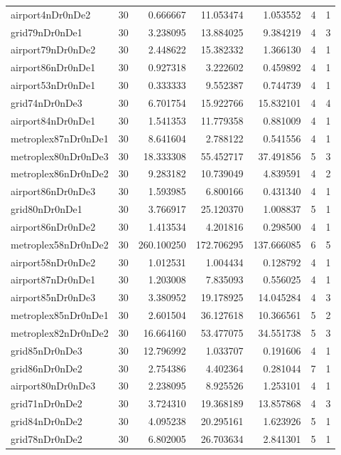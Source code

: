 \begin{longtable}{|l|r|r|r|r|r|r|}
airport4nDr0nDe2 & 30 & 0.666667 & 11.053474 & 1.053552 & 4 & 1 \\
grid79nDr0nDe1 & 30 & 3.238095 & 13.884025 & 9.384219 & 4 & 3 \\
airport79nDr0nDe2 & 30 & 2.448622 & 15.382332 & 1.366130 & 4 & 1 \\
airport86nDr0nDe1 & 30 & 0.927318 & 3.222602 & 0.459892 & 4 & 1 \\
airport53nDr0nDe1 & 30 & 0.333333 & 9.552387 & 0.744739 & 4 & 1 \\
grid74nDr0nDe3 & 30 & 6.701754 & 15.922766 & 15.832101 & 4 & 4 \\
airport84nDr0nDe1 & 30 & 1.541353 & 11.779358 & 0.881009 & 4 & 1 \\
metroplex87nDr0nDe1 & 30 & 8.641604 & 2.788122 & 0.541556 & 4 & 1 \\
metroplex80nDr0nDe3 & 30 & 18.333308 & 55.452717 & 37.491856 & 5 & 3 \\
metroplex86nDr0nDe2 & 30 & 9.283182 & 10.739049 & 4.839591 & 4 & 2 \\
airport86nDr0nDe3 & 30 & 1.593985 & 6.800166 & 0.431340 & 4 & 1 \\
grid80nDr0nDe1 & 30 & 3.766917 & 25.120370 & 1.008837 & 5 & 1 \\
airport86nDr0nDe2 & 30 & 1.413534 & 4.201816 & 0.298500 & 4 & 1 \\
metroplex58nDr0nDe2 & 30 & 260.100250 & 172.706295 & 137.666085 & 6 & 5 \\
airport58nDr0nDe2 & 30 & 1.012531 & 1.004434 & 0.128792 & 4 & 1 \\
airport87nDr0nDe1 & 30 & 1.203008 & 7.835093 & 0.556025 & 4 & 1 \\
airport85nDr0nDe3 & 30 & 3.380952 & 19.178925 & 14.045284 & 4 & 3 \\
metroplex85nDr0nDe1 & 30 & 2.601504 & 36.127618 & 10.366561 & 5 & 2 \\
metroplex82nDr0nDe2 & 30 & 16.664160 & 53.477075 & 34.551738 & 5 & 3 \\
grid85nDr0nDe3 & 30 & 12.796992 & 1.033707 & 0.191606 & 4 & 1 \\
grid86nDr0nDe2 & 30 & 2.754386 & 4.402364 & 0.281044 & 7 & 1 \\
airport80nDr0nDe3 & 30 & 2.238095 & 8.925526 & 1.253101 & 4 & 1 \\
grid71nDr0nDe2 & 30 & 3.724310 & 19.368189 & 13.857868 & 4 & 3 \\
grid84nDr0nDe2 & 30 & 4.095238 & 20.295161 & 1.623926 & 5 & 1 \\
grid78nDr0nDe2 & 30 & 6.802005 & 26.703634 & 2.841301 & 5 & 1 \\

\end{longtable}
